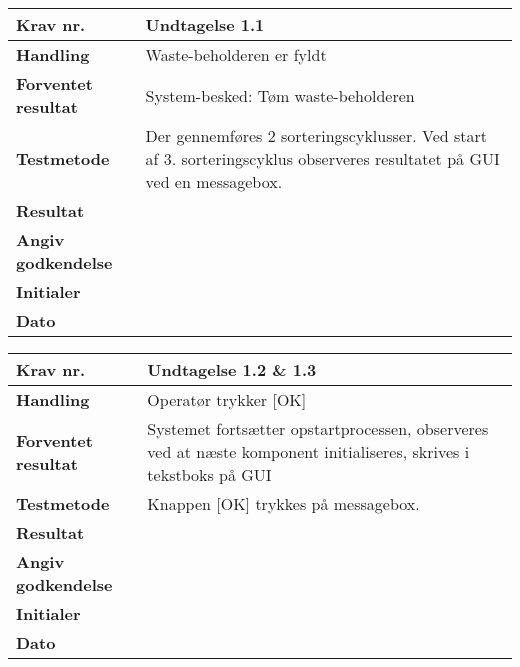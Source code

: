 		
	\begin{center}
		\begin{longtable}{ | m{4cm}| m{8.5cm}|} 
			\hline
			\textbf{Krav nr.} & Undtagelse 1.1   \\ 
			\hline
			\textbf{Handling} & Waste-beholderen er fyldt  \\
			\hline
			\textbf{Forventet resultat} & System-besked: Tøm waste-beholderen  \\
			\hline
			\textbf{Testmetode}  & Der gennemføres 2 sorteringscyklusser. Ved start af 3. sorteringscyklus observeres resultatet på GUI ved en messagebox.   \\
			\hline
			\textbf{Resultat}  &    \\
			\hline
			\textbf{Angiv godkendelse} &     \\
			\hline
			\textbf{Initialer} &     \\
			\hline
			\textbf{Dato} &    \\
			\hline
		\end{longtable}
	\end{center}
	
\newpage	
	
	\begin{center}
		\begin{longtable}{ | m{4cm}| m{8.5cm}|} 
			\hline
			\textbf{Krav nr.} & Undtagelse 1.2 \& 1.3   \\ 
			\hline
			\textbf{Handling} & Operatør trykker [OK]  \\
			\hline
			\textbf{Forventet resultat} & Systemet fortsætter opstartprocessen, observeres ved at næste komponent initialiseres, skrives i tekstboks på GUI \\
			\hline
			\textbf{Testmetode}  & Knappen [OK] trykkes på messagebox.   \\
			\hline
			\textbf{Resultat}  &    \\
			\hline
			\textbf{Angiv godkendelse} &     \\
			\hline
			\textbf{Initialer} &     \\
			\hline
			\textbf{Dato} &    \\
			\hline
		\end{longtable}
	\end{center}	

